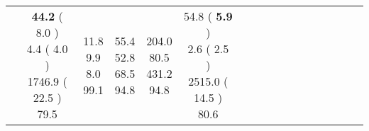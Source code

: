 \documentclass[9pt]{article}
\begin{document}
\begin{landscape}
\begin{longtable}{ l | c c c c | c c c c | c c c c | c c c c |}
 &
                    
                            \makecell{              \textbf{ 44.2 }
     (             8.0
    ) \\
            {\footnotesize             4.4
     (              4.0
     )} \\
            {\footnotesize             1746.9
     (            22.5
    ) } \\
            {\small  \textcolor[rgb]{ 0.61 , 0.29 , 0.1} {79.5  }
} }


             &
                            \makecell{              11.8
     \\
            {\footnotesize             9.9
    } \\  {\footnotesize             8.0
     } \\
            {\small \textcolor[rgb]{ 0.218 , 0.683 , 0.1} {99.1  }
} }
             &                         \makecell{              55.4
     \\
            {\footnotesize             52.8
    } \\  {\footnotesize             68.5
     } \\
            {\small \textcolor[rgb]{ 0.304 , 0.596 , 0.1} {94.8  }
} }
             &
                            \makecell{              204.0
     \\
            {\footnotesize             80.5
    } \\  {\footnotesize             431.2
     } \\
            {\small \textcolor[rgb]{ 0.304 , 0.596 , 0.1} {94.8  }
} }
            

 & 
                            \makecell{              54.8
     (             \textbf{ 5.9 }
    ) \\
            {\footnotesize             2.6
     (              2.5
     )} \\
            {\footnotesize             2515.0
     (            14.5
    ) } \\
            {\small  \textcolor[rgb]{ 0.588 , 0.311 , 0.1} {80.6  }
} }



\end{longtable}
\end{landscape}
\end{document}

